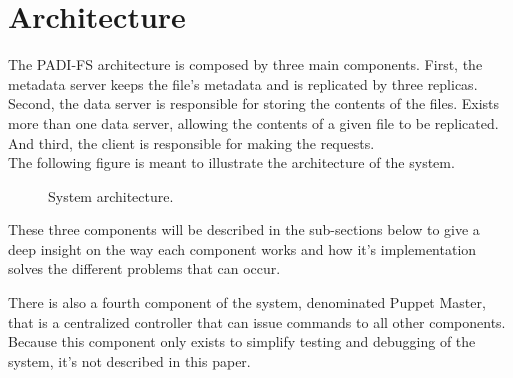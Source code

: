 \section{Architecture}

The PADI-FS architecture is composed by three main components. First, the
metadata server keeps the file's metadata and is replicated by three
replicas. Second, the data server is responsible for storing the contents
of the files. Exists more than one data server, allowing the contents of
a given file to be replicated. And third, the client is responsible for
making the requests.\\

The following figure is meant to illustrate the architecture of the system.\\

\begin{figure}[H]
  	\caption{System architecture.}
\end{figure}

These three components will be described in the sub-sections below to give
a deep insight on the way each component works and how it's implementation
solves the different problems that can occur.

There is also a fourth component of the system, denominated Puppet Master,
that is a centralized controller that can issue commands to all other
components. Because this component only exists to simplify testing and
debugging of the system, it's not described in this paper.





